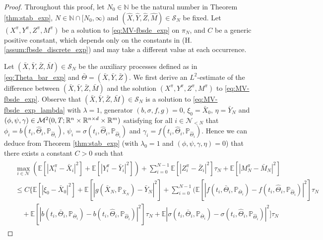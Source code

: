\documentclass[11pt]{article}
\numberwithin{equation}{section}
\theoremstyle{definition}
\theoremstyle{remark}
\def\cM{\mathcal{M}}
\def\cN{\mathcal{N}}
\def\cS{\mathcal{S}}
\def\sE{{\mathbb{E}}}
\def\sN{{\mathbb{N}}}
\def\sP{\mathbb{P}}
\def\sR{{\mathbb R}}
\begin{document}
\begin{proof}
Throughout this proof, 
let $N_0\in \sN$ be  the  natural number  in Theorem \ref{thm:stab_exp},
 $N\in \sN\cap [N_0,\infty)$
 and
 $(\hat{X},\hat{Y},\hat{Z}, \hat{M})\in \cS_N$
 be fixed.
 Let $(X^\pi,Y^\pi, Z^\pi, M^\pi)$ be  a solution to  \eqref{eq:MV-fbsde_exp}
 on $\pi_N$,
and  $C$ be a generic  positive constant, 
which
depends only on the constants   in (H.\ref{assum:fbsde_discrete_exp})
and  may take a different value at each occurrence.
 
 
Let $(\bar{X},\bar{Y},\bar{Z}, \bar{M})\in \cS_N$
be the auxiliary processes defined as in \eqref{eq:Theta_bar_exp}
and $\bar{\Theta}= (\bar{X},\bar{Y}, \bar{Z})$.
 We  first derive
  an $L^2$-estimate 
of
the difference between
 $(\bar{X},\bar{Y},\bar{Z}, \bar{M})$ and 
the solution $(X^\pi,Y^\pi, Z^\pi, M^\pi)$ to \eqref{eq:MV-fbsde_exp}.
Observe that  $(\bar{X},\bar{Y},\bar{Z}, \bar{M})\in \cS_N$
is a solution to \eqref{eq:MV-fbsde_exp_lambda} with 
$\lambda=1$, generator $({b},{\sigma},{f},{g})=0$,
${\xi}_0=\bar{X}_0$, ${\eta}=\bar{Y}_N$
and 
$({\phi},{\psi},{\gamma})\in \cM^2(0,T; \sR^n\t \sR^{n\t d}\t \sR^m)$
satisfying for all $i\in \cN_{<N}$ that
${\phi}_{i}=b(t_{i},\hat{\Theta}_{i},\sP_{\hat{\Theta}_{i}})$,
${\psi}_i=\sigma (t_i,\hat{\Theta}_i,\sP_{\hat{\Theta}_i})$
and ${\gamma}_i=f(t_{i},\hat{\Theta}_{i}, \sP_{\hat{\Theta}_{i}})$.
Hence we can deduce from 
 Theorem \ref{thm:stab_exp} 
(with $\lambda_0=1$
and $({\phi},{\psi},{\gamma},\eta)=0$)
that 
there exists a constant $C>0$ such  that
\begin{align*}
\begin{split}
&\max_{i\in \cN}
\left(
\sE[|{X}^\pi_{i}
-\bar{X}_{i}|^2]
+
\sE[|{Y}^\pi_{i}
-\bar{Y}_{i}|^2]
\right)
+
\sum_{i=0}^{N-1}
\sE
[
|{Z}^\pi_{i}
-\bar{Z}_{i}|^2]\tau_N
+
\sE[|{M}^\pi_{N}
-\bar{M}_{N}|^2]
\\
&\le
C\bigg\{
\sE[| \xi_{0}-\bar{X}_0|^2]
+
\sE[ |g(\bar{X}_N,\sP_{\bar{X}_N})
-\bar{Y}_N|^2]
+\sum_{i=0}^{N-1}
\bigg(
\sE[|{f}(t_{i},\bar{\Theta}_i,\sP_{\bar{\Theta}_i})-f(t_{i},\hat{\Theta}_{i}, \sP_{\hat{\Theta}_{i}})|^2]\tau_N
\\
&\quad
+
\sE[|{b}(t_{i},\bar{\Theta}_{i},\sP_{\bar{\Theta}_{i}})- b(t_{i},\hat{\Theta}_{i},\sP_{\hat{\Theta}_{i}})|^2]\tau_N
+
\sE|{\sigma}(t_i,\bar{\Theta}_i,\sP_{\bar{\Theta}_i})-\sigma (t_i,\hat{\Theta}_i,\sP_{\hat{\Theta}_i})|^2]\tau_N

\end{split}
\end{align*}
\end{proof}
\end{document}
